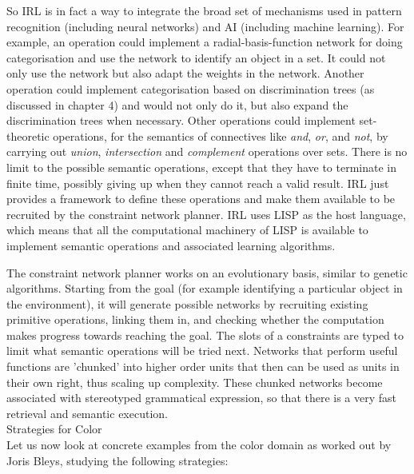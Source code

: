 So IRL is in fact a way to integrate the broad set of mechanisms used in 
pattern recognition (including neural networks) and AI (including machine learning). 
For example, an operation could implement a radial-basis-function network for doing categorisation and 
use the network to identify an object in a set. It could not only use the network but also adapt 
the weights in the network. Another operation could implement categorisation based 
on discrimination trees (as discussed in chapter 4) and would not only do it, but also expand the discrimination trees 
when necessary. Other operations could implement set-theoretic operations, 
for the semantics of connectives like {\itshape and}, {\itshape or}, and {\itshape not}, by carrying out
{\itshape union}, {\itshape intersection} and {\itshape complement} operations over sets. There is no 
limit to the possible semantic operations, except that they have to terminate in finite time, possibly giving up when 
they cannot reach a valid result. IRL just provides a framework to define these operations and make them available 
to be recruited by the constraint network planner. IRL uses LISP as the host language, which means that all 
the computational machinery of LISP is available to implement semantic operations and associated learning algorithms. 

The constraint network planner works on an evolutionary basis, similar to genetic algorithms. Starting from the goal 
(for example identifying a particular object in the environment), it will generate possible networks by recruiting 
existing primitive operations, linking them in, and checking whether the computation makes progress towards reaching the goal. 
The slots of a constraints are typed to limit what semantic operations will be tried next. Networks that perform useful 
functions are 'chunked' into higher order units that then can be used as units in their own right, thus scaling up 
complexity. These chunked networks become associated with stereotyped grammatical expression, so that there is a very 
fast retrieval and semantic execution. \\

{\bfshape Strategies for Color} \\

Let us now look at concrete examples from the color domain as worked out by Joris Bleys, studying the following 
strategies: 

